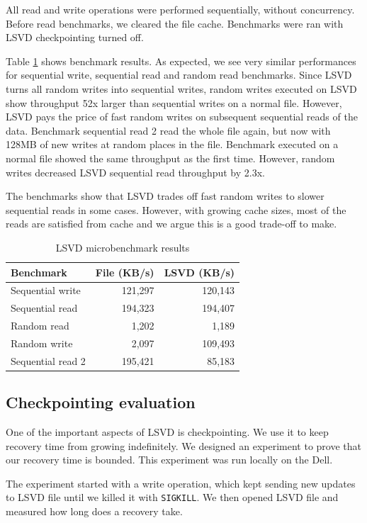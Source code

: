 All read and write operations were performed sequentially, without concurrency. Before read benchmarks, we cleared the file cache. Benchmarks were ran with LSVD checkpointing turned off.

Table \ref{tab:lsvd} shows benchmark results. As expected, we see very similar performances for sequential write, sequential read and random read benchmarks. Since LSVD turns all random writes into sequential writes, random writes executed on LSVD show throughput 52x larger than sequential writes on a normal file. However, LSVD pays the price of fast random writes on subsequent sequential reads of the data. Benchmark sequential read 2 read the whole file again, but now with 128MB of new writes at random places in the file. Benchmark executed on a normal file showed the same throughput as the first time. However, random writes decreased LSVD sequential read throughput by 2.3x.

The benchmarks show that LSVD trades off fast random writes to slower sequential reads in some cases. However, with growing cache sizes, most of the reads are satisfied from cache and we argue this is a good trade-off to make.

\begin{table}
\centering
\caption{LSVD microbenchmark results}
\label{tab:lsvd}
\begin{tabular}{ | l | r | r | }
\hline
\textbf{Benchmark} & \textbf{File (KB/s)} & \textbf{LSVD (KB/s)} \\
\hline
Sequential write & 121,297 & 120,143 \\
\hline
Sequential read & 194,323 & 194,407 \\
\hline
Random read & 1,202 & 1,189 \\
\hline
Random write & 2,097 & 109,493 \\
\hline
Sequential read 2 & 195,421 & 85,183 \\
\hline
\end{tabular}
\end{table}

\subsection{Checkpointing evaluation}
One of the important aspects of LSVD is checkpointing. We use it to keep recovery time from growing indefinitely. We designed an experiment to prove that our recovery time is bounded. This experiment was run locally on the Dell.

The experiment started with a write operation, which kept sending new updates to LSVD file until we killed it with \texttt{SIGKILL}. We then opened LSVD file and measured how long does a recovery take.

